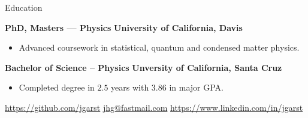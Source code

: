 \documentclass[11pt,a4paper]{article}
\newcommand{\ComputationalPhysics}{
  \href{http://young.physics.ucsc.edu/115/}{Computational Physics}
}
\newcommand{\MathematicalMethods}{
  \href{http://scipp.ucsc.edu/~haber/ph116C/}{Mathematical Methods}
}
\begin{document}
\begin{mysection}{Education}

  \begin{addmargin}[0.5em]{0em}
    {\large\bfseries PhD, Masters --- Physics}
    \hfill {\bfseries University of California, Davis}
    \begin{adjustwidth}{1ex}{0ex}

    \begin{itemize}
        [label=-, topsep=0pt, itemsep=0.5ex, parsep=0pt, leftmargin=1em]
      \item Advanced coursework in statistical, quantum and condensed matter
            physics.
    \end{itemize}
    \end{adjustwidth}
  \end{addmargin}

  \medskip

  \begin{addmargin}[0.5em]{0em}
    {\large\bfseries Bachelor of Science -- Physics}
    \hfill {\bfseries Unversity of California, Santa Cruz}
    \begin{adjustwidth}{1ex}{0ex}

   \begin{itemize}
     [label=-, topsep=0pt, itemsep=0.5ex, parsep=0pt, leftmargin=1em]
     \item Completed degree in $2.5$ years with $3.86$ in major GPA.
   \end{itemize}

    \end{adjustwidth}
  \end{addmargin}

\end{mysection}

\vfill

\begin{center}
  \href{https://github.com/jgarst}{https://github.com/jgarst}
  \textbullet{}
  \href{mailto:jhg@fastmail.com}{jhg@fastmail.com}
  \textbullet{}
  \href{https://www.linkedin.com/in/jgarst}
       {https://www.linkedin.com/in/jgarst}
\end{center}
\end{document}
